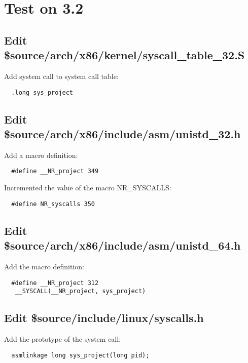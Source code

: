 
\section{Test on 3.2}
  \subsection{Edit \$source/arch/x86/kernel/syscall\_table\_32.S}
  Add system call to system call table:
  \begin{verbatim}
  .long sys_project
  \end{verbatim}
  
  \subsection{Edit \$source/arch/x86/include/asm/unistd\_32.h}
  Add a macro definition:
  \begin{verbatim}
  #define __NR_project 349
  \end{verbatim}
  Incremented the value of the macro NR\_SYSCALLS:
  \begin{verbatim}
  #define NR_syscalls 350
  \end{verbatim}
  
  \subsection{Edit \$source/arch/x86/include/asm/unistd\_64.h}
  Add the macro definition:
  \begin{verbatim}
  #define __NR_project 312
   __SYSCALL(__NR_project, sys_project)
  \end{verbatim}
  
  \subsection{Edit \$source/include/linux/syscalls.h}
  Add the prototype of the system call:
  \begin{verbatim}
  asmlinkage long sys_project(long pid);
  \end{verbatim}
   
